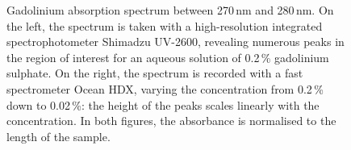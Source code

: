 \begin{figure}
	\centering
	\resizebox{0.45\linewidth}{!}{}
	\resizebox{0.45\linewidth}{!}{}
	\caption{Gadolinium absorption spectrum between 270\,nm and 280\,nm.
		On the left, the spectrum is taken with a high-resolution integrated spectrophotometer %
		Shimadzu UV-2600, revealing numerous peaks in the region of interest for an aqueous solution %
		of 0.2\,\% gadolinium sulphate.
		On the right, the spectrum is recorded with a fast spectrometer Ocean HDX, varying the concentration 
		from 0.2\,\% down to 0.02\,\%: the height of the peaks scales linearly with the concentration.
		In both figures, the absorbance is normalised to the length of the sample.}
	\label{fig:gad_lines}
\end{figure}


